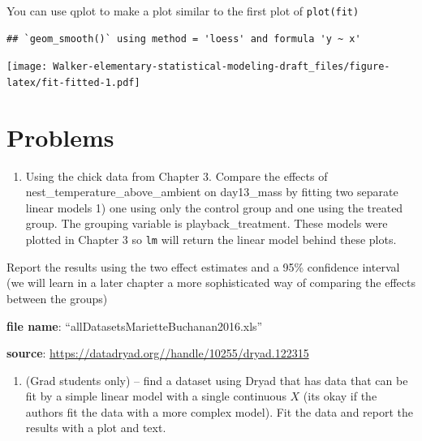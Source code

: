 \documentclass[]{book}
\newenvironment{Shaded}{\begin{snugshade}}{\end{snugshade}}
\newcommand{\KeywordTok}[1]{\textcolor[rgb]{0.13,0.29,0.53}{\textbf{#1}}}
\newcommand{\DataTypeTok}[1]{\textcolor[rgb]{0.13,0.29,0.53}{#1}}
\newcommand{\StringTok}[1]{\textcolor[rgb]{0.31,0.60,0.02}{#1}}
\newcommand{\OperatorTok}[1]{\textcolor[rgb]{0.81,0.36,0.00}{\textbf{#1}}}
\newcommand{\NormalTok}[1]{#1}
\providecommand{\tightlist}{%
  \setlength{\itemsep}{0pt}\setlength{\parskip}{0pt}}
\begin{document}
You can use qplot to make a plot similar to the first plot of
\texttt{plot(fit)}

\begin{Shaded}
\end{Shaded}

\begin{verbatim}
## `geom_smooth()` using method = 'loess' and formula 'y ~ x'
\end{verbatim}

\texttt{[image: Walker-elementary-statistical-modeling-draft\_files/figure-latex/fit-fitted-1.pdf]}

\section{Problems}\label{problems-1}

\begin{enumerate}
\def\labelenumi{\arabic{enumi}.}
\tightlist
\item
  Using the chick data from Chapter 3. Compare the effects of
  nest\_temperature\_above\_ambient on day13\_mass by fitting two
  separate linear models 1) one using only the control group and one
  using the treated group. The grouping variable is playback\_treatment.
  These models were plotted in Chapter 3 so \texttt{lm} will return the
  linear model behind these plots.
\end{enumerate}

Report the results using the two effect estimates and a 95\% confidence
interval (we will learn in a later chapter a more sophisticated way of
comparing the effects between the groups)

\textbf{file name}: ``allDatasetsMarietteBuchanan2016.xls''

\textbf{source}: \url{https://datadryad.org//handle/10255/dryad.122315}

\begin{enumerate}
\def\labelenumi{\arabic{enumi}.}
\setcounter{enumi}{1}
\tightlist
\item
  (Grad students only) -- find a dataset using Dryad that has data that
  can be fit by a simple linear model with a single continuous \(X\)
  (its okay if the authors fit the data with a more complex model). Fit
  the data and report the results with a plot and text.
\end{enumerate}
\end{document}
